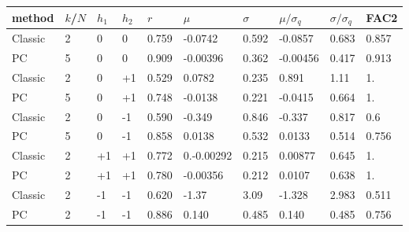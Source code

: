 \begin{tabular}{|llll|lll|lll|}
	\hline
method & $k$/$N$ & $h_1$ & $h_2$ & $r$ & $\mu$ & $\sigma$ & $\mu/\sigma_q$ & $\sigma/\sigma_q$ & FAC2 \\\hline\hline
	Classic & 2 &  0 & 0 & 0.759 & -0.0742 & 0.592 & -0.0857 & 0.683 & 0.857 \\
	PC & 5 & 0 & 0 & 0.909 & -0.00396 & 0.362 & -0.00456 & 0.417 & 0.913 \\
	\hline
	Classic & 2 & 0 & +1 & 0.529 & 0.0782 & 0.235 & 0.891 & 1.11 & 1. \\
	PC & 5 & 0 & +1 & 0.748 & -0.0138 & 0.221 & -0.0415 & 0.664 & 1. \\
	\hline
	Classic & 2 & 0 & -1 & 0.590 & -0.349 & 0.846 & -0.337 & 0.817 & 0.6 \\
	PC & 5 &  0 & -1 & 0.858 & 0.0138 & 0.532 & 0.0133 & 0.514 & 0.756 \\
	\hline
	Classic & 2 & +1 & +1 & 0.772 & 0.-0.00292 & 0.215 & 0.00877 & 0.645 & 1. \\
	PC & 2 & +1 & +1 & 0.780 & -0.00356 & 0.212 & 0.0107 & 0.638 & 1. \\
	\hline
	Classic & 2 & -1 & -1 & 0.620 & -1.37 & 3.09 & -1.328 & 2.983 & 0.511 \\
	PC & 2 & -1 & -1 & 0.886 & 0.140 & 0.485 & 0.140 & 0.485 & 0.756 \\
	\hline
\end{tabular}


